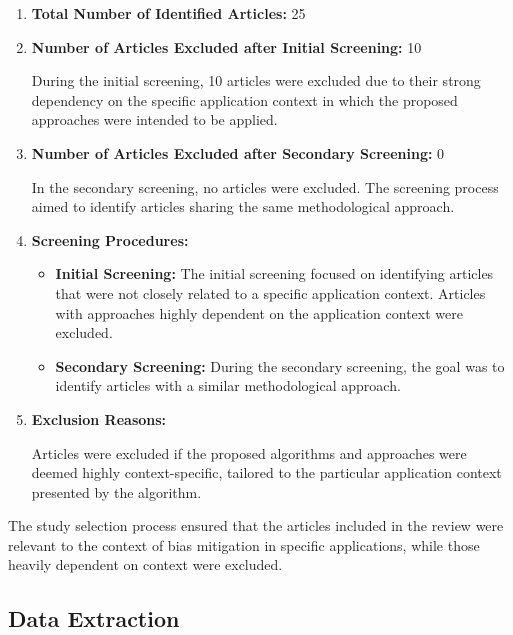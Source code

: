 \documentclass{article}
\begin{document}
    \begin{enumerate}
        \item \textbf{Total Number of Identified Articles:} 25
        \item \textbf{Number of Articles Excluded after Initial Screening:} 10
        
        During the initial screening, 10 articles were excluded due to their strong dependency on the specific application context in which the proposed approaches were intended to be applied.
        
        \item \textbf{Number of Articles Excluded after Secondary Screening:} 0
        
        In the secondary screening, no articles were excluded. The screening process aimed to identify articles sharing the same methodological approach.
        
        \item \textbf{Screening Procedures:}
        
        \begin{itemize}
            \item \textbf{Initial Screening:} The initial screening focused on identifying articles that were not closely related to a specific application context. Articles with approaches highly dependent on the application context were excluded.
            
            \item \textbf{Secondary Screening:} During the secondary screening, the goal was to identify articles with a similar methodological approach.
        \end{itemize}
        
        \item \textbf{Exclusion Reasons:}
        
        Articles were excluded if the proposed algorithms and approaches were deemed highly context-specific, tailored to the particular application context presented by the algorithm.
    
    \end{enumerate}
    
    The study selection process ensured that the articles included in the review were relevant to the context of bias mitigation in specific applications, while those heavily dependent on context were excluded.
    \subsection{Data Extraction}
\end{document}

